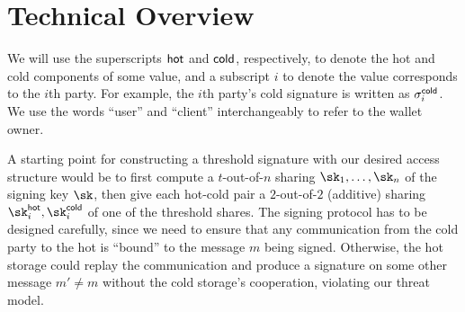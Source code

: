 \section{Technical Overview}

We will use the superscripts $\mathsf{hot}$ and $\mathsf{cold}$, respectively, to denote the hot and cold components of some value, and a subscript $i$ to denote the value corresponds to the $i$th party. For example, the $i$th party's cold signature is written as $\sigma_i^{\mathsf{cold}}$. We use the words ``user'' and ``client'' interchangeably to refer to the wallet owner.

A starting point for constructing a threshold signature with our desired access structure would be to first compute a $t$-out-of-$n$ sharing $\sk_1, \dots, \sk_n$ of the signing key $\sk$, then give each hot-cold pair a $2$-out-of-$2$ (additive) sharing $\sk_i^\hot, \sk_i^\cold$ of one of the threshold shares. 
The signing protocol has to be designed carefully, since we need to ensure that any communication from the cold party to the hot is ``bound'' to the message $m$ being signed. Otherwise, the hot storage could replay the communication and produce a signature on some other message $m' \neq m$ without the cold storage's cooperation, violating our threat model.


